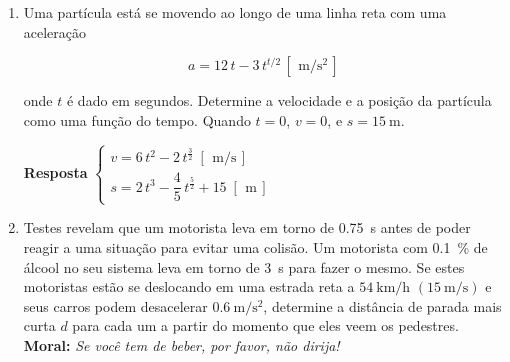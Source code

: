 \documentclass[a4paper,12pt]{article}
\begin{document}
	\begin{enumerate}
		\item Uma partícula está se movendo ao longo de uma linha reta com uma aceleração
		
		\begin{equation}
		a=12\,t-3\,t^{t/2}\, [\,\SI{}{\meter/\second^{2}}\,]
		\end{equation}
		
		onde $t$ é dado em segundos. Determine a velocidade e a posição da partícula como uma função
		do tempo. Quando $t=0$, $v=0$, e $s=\SI{15}{\meter}$.
		
		
		\textbf{Resposta}
		$
		\begin{cases}
		v=6\,t^{2}-2\,t^{\frac{3}{2}}\;[\,\SI{}{\meter/\second}\,]\\
		s=2\,t^{3}-\dfrac{4}{5}\,t^{\frac{5}{2}}+15\;[\,\SI{}{\meter}\,]
		\end{cases}
		$
		
		
		\item Testes revelam que um motorista leva em torno de \SI{0.75}{\second} antes de poder reagir a uma
		situação para evitar uma colisão. Um motorista com \SI{0.1}{\percent} de álcool no seu sistema leva em torno de \SI{3}{\second} para fazer o mesmo. Se estes motoristas estão se deslocando em uma estrada reta a $\SI{54}{\kilo\meter/\hour}$ $(\SI{15}{\meter/\second})$ e seus carros podem desacelerar $\SI{0.6}{\meter/\second^{2}}$, determine a distância de parada mais curta $d$ para
		cada um a partir do momento que eles veem os pedestres. \textbf{Moral:} \textit{Se você tem de beber, por favor, não dirija!}
		

\end{enumerate}
\end{document}
